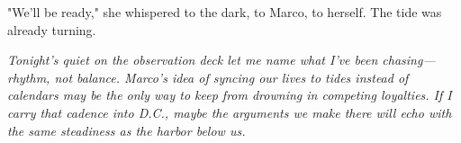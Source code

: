 "We'll be ready," she whispered to the dark, to Marco, to herself. The tide was already turning.

\noindent\textit{Tonight's quiet on the observation deck let me name what I've been chasing—rhythm, not balance. Marco's idea of syncing our lives to tides instead of calendars may be the only way to keep from drowning in competing loyalties. If I carry that cadence into D.C., maybe the arguments we make there will echo with the same steadiness as the harbor below us.}
